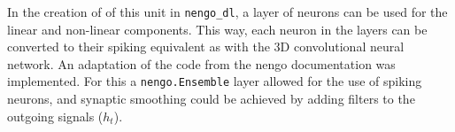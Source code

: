 In the creation of of this unit in \lstinline{nengo_dl}, a layer of neurons can be used for the linear and non-linear components. This way, each neuron in the layers can be converted to their spiking equivalent as with the 3D convolutional neural network. An adaptation of the code from the nengo documentation\cite{NengoLMU} was implemented. For this a \lstinline{nengo.Ensemble} layer allowed for the use of spiking neurons, and synaptic smoothing could be achieved by adding filters to the outgoing signals ($ h_t $).